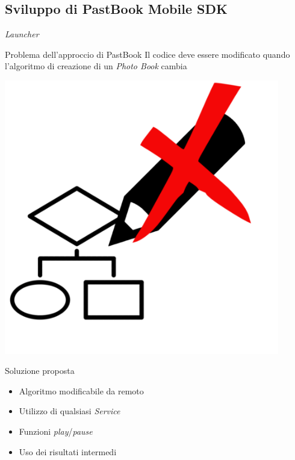 	\subsection{Sviluppo di PastBook Mobile SDK}
		\begin{frame}{\emph{Launcher}}
			\begin{minipage}{0.97\textwidth}
				\begin{block}{Problema dell'approccio di PastBook}
					Il codice deve essere modificato quando l'algoritmo di creazione di un
					\emph{Photo Book} cambia
				\end{block}
			\end{minipage}\par
			\begin{minipage}{0.29\textwidth}
				\includegraphics[width=0.9\textwidth]{capitolo_3/immagini/modifica_algoritmo.png}
			\end{minipage}
			\begin{minipage}{0.67\textwidth}
				\begin{block}{Soluzione proposta}
					\begin{itemize}
						\item Algoritmo modificabile da remoto
						\item Utilizzo di qualsiasi \emph{Service}
						\item Funzioni \emph{play}/\emph{pause}
						\item Uso dei risultati intermedi
					\end{itemize}
				\end{block}
			\end{minipage}
		\end{frame}
